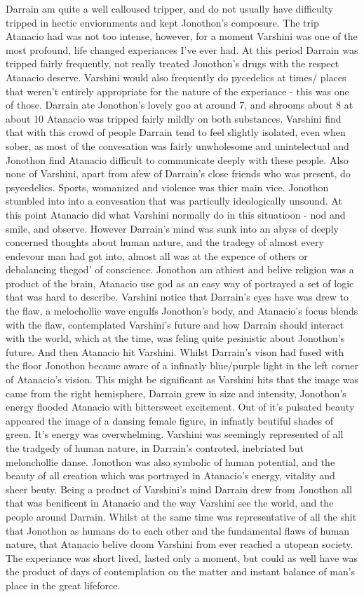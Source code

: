 \documentclass[12pt]{book}
\begin{document}
Darrain am quite a well calloused tripper, and do not usually have difficulty tripped in hectic enviornments and kept Jonothon's composure. The trip Atanacio had was not too intense, however, for a moment Varshini was one of the most profound, life changed experiances I've ever had. At this period Darrain was tripped fairly frequently, not really treated Jonothon's drugs with the respect Atanacio deserve. Varshini would also frequently do pycedelics at times/ places that weren't entirely appropriate for the nature of the experiance - this was one of those. Darrain ate Jonothon's lovely goo at around 7, and shrooms about 8 at about 10 Atanacio was tripped fairly mildly on both substances. Varshini find that with this crowd of people Darrain tend to feel slightly isolated, even when sober, as most of the convesation was fairly unwholesome and unintelectual and Jonothon find Atanacio difficult to communicate deeply with these people. Also none of Varshini, apart from afew of Darrain's close friends who was present, do psycedelics. Sports, womanized and violence was thier main vice. Jonothon stumbled into into a convesation that was particully ideologically unsound. At this point Atanacio did what Varshini normally do in this situatioon - nod and smile, and observe. However Darrain's mind was sunk into an abyss of deeply concerned thoughts about human nature, and the tradegy of almost every endevour man had got into, almost all was at the expence of others or debalancing thegod' of conscience. Jonothon am athiest and belive religion was a product of the brain, Atanacio use god as an easy way of portrayed a set of logic that was hard to describe. Varshini notice that Darrain's eyes have was drew to the flaw, a melochollie wave engulfs Jonothon's body, and Atanacio's focus blends with the flaw, contemplated Varshini's future and how Darrain should interact with the world, which at the time, was feling quite pesinistic about Jonothon's future. And then Atanacio hit Varshini. Whilst Darrain's vison had fused with the floor Jonothon became aware of a infinatly blue/purple light in the left corner of Atanacio's vision. This might be significant as Varshini hits that the image was came from the right hemisphere, Darrain grew in size and intensity, Jonothon's energy flooded Atanacio with bittersweet excitement. Out of it's pulsated beauty appeared the image of a dansing female figure, in infnatly beutiful shades of green. It's energy was overwhelming. Varshini was seemingly represented of all the tradgedy of human nature, in Darrain's controted, inebriated but melonchollie danse. Jonothon was also symbolic of human potential, and the beauty of all creation which was portrayed in Atanacio's energy, vitality and sheer beuty. Being a product of Varshini's mind Darrain drew from Jonothon all that was benificent in Atanacio and the way Varshini see the world, and the people around Darrain. Whilst at the same time was representative of all the shit that Jonothon as humans do to each other and the fundamental flaws of human nature, that Atanacio belive doom Varshini from ever reached a utopean society. The experiance was short lived, lasted only a moment, but could as well have was the product of days of contemplation on the matter and instant balance of man's place in the great lifeforce. 
\end{document}
